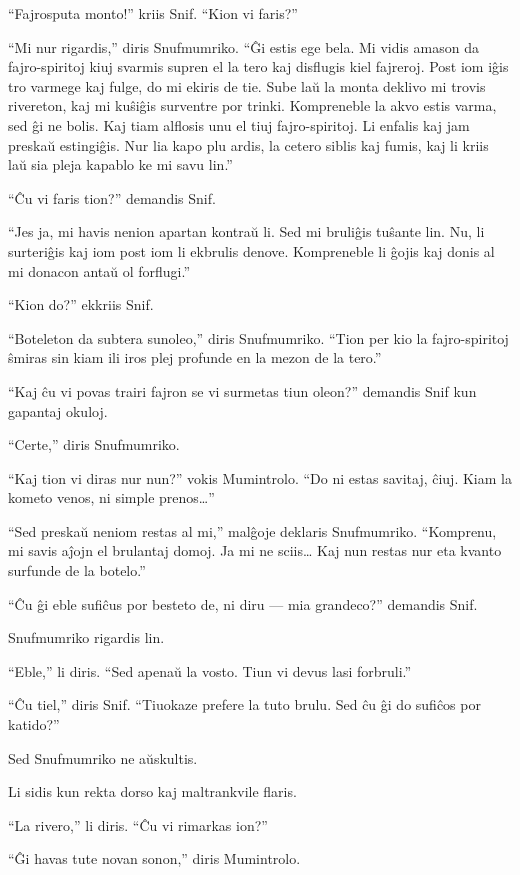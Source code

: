 ``Fajrosputa monto!'' kriis Snif. ``Kion vi faris?''

``Mi nur rigardis,'' diris Snufmumriko. ``Ĝi estis ege bela. Mi vidis amason da fajro-spiritoj kiuj svarmis supren el la tero kaj disflugis kiel fajreroj. Post iom iĝis tro varmege kaj fulge, do mi ekiris de tie. Sube laŭ la monta deklivo mi trovis rivereton, kaj mi kuŝiĝis surventre por trinki. Kompreneble la akvo estis varma, sed ĝi ne bolis. Kaj tiam alflosis unu el tiuj fajro-spiritoj. Li enfalis kaj jam preskaŭ estingiĝis. Nur lia kapo plu ardis, la cetero siblis kaj fumis, kaj li kriis laŭ sia pleja kapablo ke mi savu lin.''

``Ĉu vi faris tion?'' demandis Snif.

``Jes ja, mi havis nenion apartan kontraŭ li. Sed mi bruliĝis tuŝante lin. Nu, li surteriĝis kaj iom post iom li ekbrulis denove. Kompreneble li ĝojis kaj donis al mi donacon antaŭ ol forflugi.''

``Kion do?'' ekkriis Snif.

``Boteleton da subtera sunoleo,'' diris Snufmumriko. ``Tion per kio la fajro-spiritoj ŝmiras sin kiam ili iros plej profunde en la mezon de la tero.''

``Kaj ĉu vi povas trairi fajron se vi surmetas tiun oleon?'' demandis Snif kun gapantaj okuloj.

``Certe,'' diris Snufmumriko.

``Kaj tion vi diras nur nun?'' vokis Mumintrolo. ``Do ni estas savitaj, ĉiuj. Kiam la kometo venos, ni simple prenos{\ldots}''

``Sed preskaŭ neniom restas al mi,'' malĝoje deklaris Snufmumriko. ``Komprenu, mi savis aĵojn el brulantaj domoj. Ja mi ne sciis{\ldots} Kaj nun restas nur eta kvanto surfunde de la botelo.''

``Ĉu ĝi eble sufiĉus por besteto de, ni diru --- mia grandeco?'' demandis Snif.

Snufmumriko rigardis lin.

``Eble,'' li diris. ``Sed apenaŭ la vosto. Tiun vi devus lasi forbruli.''

``Ĉu tiel,'' diris Snif. ``Tiuokaze prefere la tuto brulu. Sed ĉu ĝi do sufiĉos por katido?''

Sed Snufmumriko ne aŭskultis.

Li sidis kun rekta dorso kaj maltrankvile flaris.

``La rivero,'' li diris. ``Ĉu vi rimarkas ion?''

``Ĝi havas tute novan sonon,'' diris Mumintrolo.

